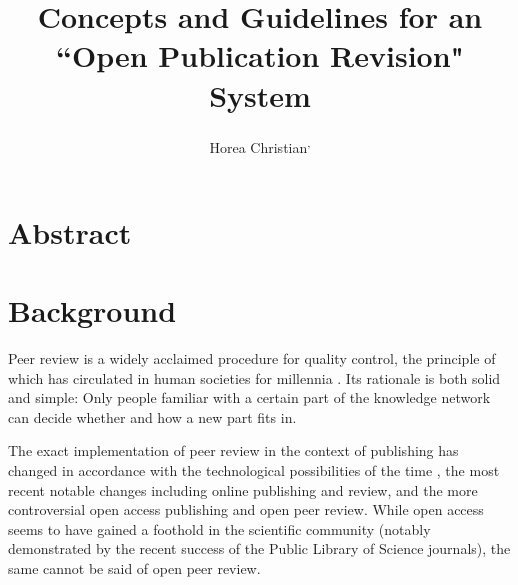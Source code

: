 
\title{Concepts and Guidelines for an ``Open Publication Revision" System} %
\posttitle{\par\end{flushleft}}

\author{Horea Christian\protect{}\textsuperscript{,}\protect{}
		} %
\postauthor{\par\end{flushleft}\HorRule}

\date{\color{Aubergine}} %


\maketitle
\thispagestyle{fancy} %
\section{Abstract}
\noindent\textbf{} %

\section{Background}
Peer review is a widely acclaimed procedure for quality control, the principle of which has circulated in human societies for millennia \cite{Spier2002}.
Its rationale is both solid and simple: Only people familiar with a certain part of the knowledge network can decide whether and how a new part fits in. 

The exact implementation of peer review in the context of publishing has changed in accordance with the technological possibilities of the time \cite{Spier2002}, the most recent notable changes including online publishing and review, and the more controversial open access publishing\cite{VanNoorden2013,Parker2013} and open peer review.
While open access seems to have gained a foothold in the scientific community (notably demonstrated by the recent success of the Public Library of Science journals), the same cannot be said of open peer review.

